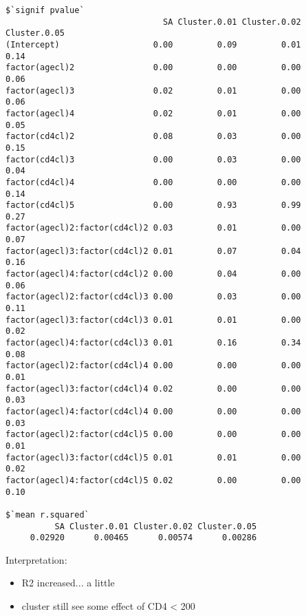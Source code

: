 \documentclass[]{revtex4}\usepackage[]{graphicx}\usepackage[]{color}
\makeatletter
\newenvironment{kframe}{%
 \def\at@end@of@kframe{}%
 \ifinner\ifhmode%
  \def\at@end@of@kframe{\end{minipage}}%
  \begin{minipage}{\columnwidth}%
 \fi\fi%
 \def\FrameCommand##1{\hskip\@totalleftmargin \hskip-\fboxsep
 \colorbox{shadecolor}{##1}\hskip-\fboxsep
     \hskip-\linewidth \hskip-\@totalleftmargin \hskip\columnwidth}%
 \MakeFramed {\advance\hsize-\width
   \@totalleftmargin\z@ \linewidth\hsize
   \@setminipage}}%
 {\par\unskip\endMakeFramed%
 \at@end@of@kframe}
\newenvironment{knitrout}{}{} %
\makeatother
\begin{document}
\begin{knitrout}
\begin{kframe}
\begin{verbatim}
$`signif pvalue`
                                SA Cluster.0.01 Cluster.0.02 Cluster.0.05
(Intercept)                   0.00         0.09         0.01         0.14
factor(agecl)2                0.00         0.00         0.00         0.06
factor(agecl)3                0.02         0.01         0.00         0.06
factor(agecl)4                0.02         0.01         0.00         0.05
factor(cd4cl)2                0.08         0.03         0.00         0.15
factor(cd4cl)3                0.00         0.03         0.00         0.04
factor(cd4cl)4                0.00         0.00         0.00         0.14
factor(cd4cl)5                0.00         0.93         0.99         0.27
factor(agecl)2:factor(cd4cl)2 0.03         0.01         0.00         0.07
factor(agecl)3:factor(cd4cl)2 0.01         0.07         0.04         0.16
factor(agecl)4:factor(cd4cl)2 0.00         0.04         0.00         0.06
factor(agecl)2:factor(cd4cl)3 0.00         0.03         0.00         0.11
factor(agecl)3:factor(cd4cl)3 0.01         0.01         0.00         0.02
factor(agecl)4:factor(cd4cl)3 0.01         0.16         0.34         0.08
factor(agecl)2:factor(cd4cl)4 0.00         0.00         0.00         0.01
factor(agecl)3:factor(cd4cl)4 0.02         0.00         0.00         0.03
factor(agecl)4:factor(cd4cl)4 0.00         0.00         0.00         0.03
factor(agecl)2:factor(cd4cl)5 0.00         0.00         0.00         0.01
factor(agecl)3:factor(cd4cl)5 0.01         0.01         0.00         0.02
factor(agecl)4:factor(cd4cl)5 0.02         0.00         0.00         0.10

$`mean r.squared`
          SA Cluster.0.01 Cluster.0.02 Cluster.0.05 
     0.02920      0.00465      0.00574      0.00286 
\end{verbatim}
\end{kframe}
\end{knitrout}
Interpretation: 
\begin{itemize}
\item R2 increased... a little
\item cluster still see some effect of CD4 < 200
\end{itemize}

\end{document}
